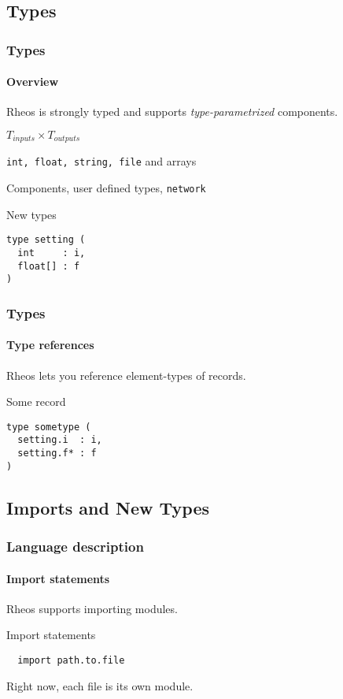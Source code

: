 \documentclass[10pt]{beamer}
\begin{document}
\subsection*{Types}
\begin{frame}[fragile]
\frametitle{Types}
\framesubtitle{Overview}

Rheos is strongly typed and supports \emph{type-parametrized}
components.

\begin{description}
\pause
\item [Components:] $T_{inputs} \times T_{outputs}$
\pause
\item [Primitive types:] \verb|int, float, string, file| and arrays
\pause
\item [Record types:] Components, user defined types, \verb|network|
\end{description}

\pause
\begin{block}{New types}
\begin{verbatim}
type setting (
  int     : i,
  float[] : f
)
\end{verbatim}
\end{block}

\end{frame}


\begin{frame}[fragile]
\frametitle{Types}
\framesubtitle{Type references}

Rheos lets you reference element-types of records.

\pause
\begin{block}{Some record}
\begin{verbatim}
type sometype (
  setting.i  : i,
  setting.f* : f
)
\end{verbatim}
\end{block}

\end{frame}


\subsection*{Imports and New Types}
\begin{frame}[fragile]
\frametitle{Language description}
\framesubtitle{Import statements}

Rheos supports importing modules.

\pause
\begin{block}{Import statements}
\begin{verbatim}
  import path.to.file
\end{verbatim}
\end{block}

\pause
Right now, each file is its own module.

\end{frame}
\end{document}
